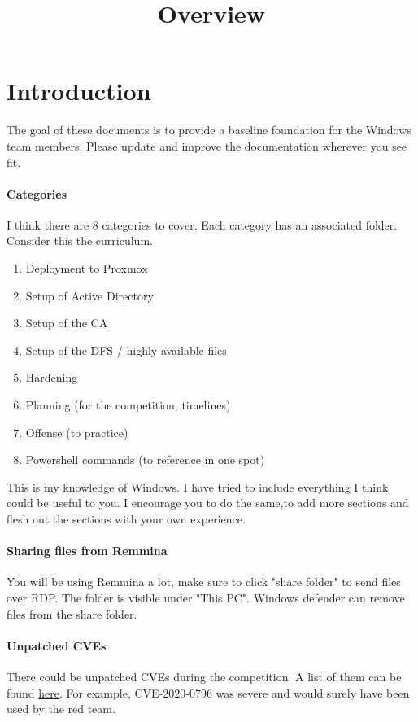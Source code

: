 \documentclass{article}
\title{Overview}
\begin{document}
\maketitle

\graphicspath{ {./Images/} }
\tableofcontents

\section{Introduction}
The goal of these documents is to provide a baseline foundation for the Windows team members.
Please update and improve the documentation wherever you see fit.

\paragraph{Categories} I think there are 8 categories to cover. Each category has an associated folder. Consider this the curriculum.

\begin{enumerate}
        \item Deployment to Proxmox
        \item Setup of Active Directory
        \item Setup of the CA
        \item Setup of the DFS / highly available files
        \item Hardening
        \item Planning (for the competition, timelines)
        \item Offense (to practice)
        \item Powershell commands (to reference in one spot)
\end{enumerate}

This is my knowledge of Windows. I have tried to include everything I think could be useful to you.
I encourage you to do the same,to  add more sections and flesh out the sections with your own experience.

\paragraph{Sharing files from Remmina}
You will be using Remmina a lot, make sure to click "share folder" to send files over RDP.
The folder is visible under "This PC".
Windows defender can remove files from the share folder.

\paragraph{Unpatched CVEs}
There could be unpatched CVEs during the competition. A list of them can be found \href{https://stack.watch/product/microsoft/windows-server-2019/}{here}.
For example, CVE-2020-0796 was severe and would surely have been used by the red team.
\end{document}

